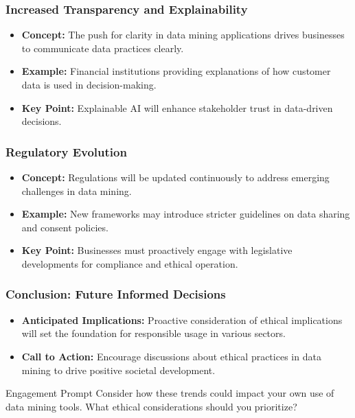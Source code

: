 \documentclass{beamer}
\begin{document}
\begin{frame}[fragile]
    \frametitle{Increased Transparency and Explainability}
    \begin{itemize}
        \item \textbf{Concept:} The push for clarity in data mining applications drives businesses to communicate data practices clearly.
        \item \textbf{Example:} Financial institutions providing explanations of how customer data is used in decision-making.
        \item \textbf{Key Point:} Explainable AI will enhance stakeholder trust in data-driven decisions.
    \end{itemize}
\end{frame}

\begin{frame}[fragile]
    \frametitle{Regulatory Evolution}
    \begin{itemize}
        \item \textbf{Concept:} Regulations will be updated continuously to address emerging challenges in data mining.
        \item \textbf{Example:} New frameworks may introduce stricter guidelines on data sharing and consent policies.
        \item \textbf{Key Point:} Businesses must proactively engage with legislative developments for compliance and ethical operation.
    \end{itemize}
\end{frame}

\begin{frame}[fragile]
    \frametitle{Conclusion: Future Informed Decisions}
    \begin{itemize}
        \item \textbf{Anticipated Implications:} Proactive consideration of ethical implications will set the foundation for responsible usage in various sectors.
        \item \textbf{Call to Action:} Encourage discussions about ethical practices in data mining to drive positive societal development.
    \end{itemize}
    \begin{block}{Engagement Prompt}
        Consider how these trends could impact your own use of data mining tools. What ethical considerations should you prioritize?
    \end{block}
\end{frame}
\end{document}
